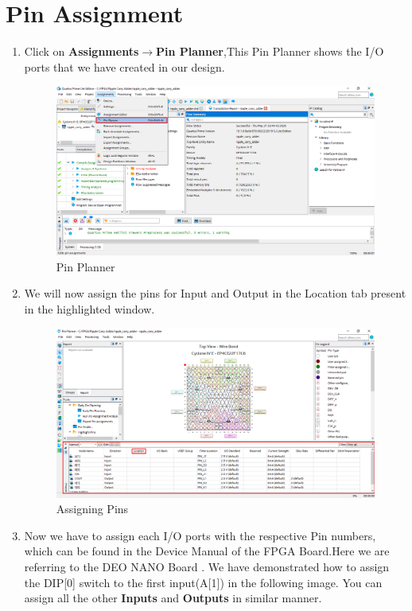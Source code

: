 \documentclass[12pt,singleside,a4paper]{article}
\begin{document}
\section{Pin  Assignment}
\begin{enumerate}

    \item Click on \textbf{Assignments}$\rightarrow$\textbf{Pin Planner},This Pin Planner shows the I/O ports that we have created in our design.
    \begin{figure}[H]
        \centering
        \includegraphics[width=14cm,keepaspectratio]{img11.png}
    \caption{Pin Planner}
    \end{figure}
    \newpage
    \item We will now assign the pins for Input and Output in the Location tab present in the highlighted window.
    \begin{figure}[H]
        \centering
        \includegraphics[width=14cm,keepaspectratio]{img12.png}
    \caption{Assigning Pins}
    \end{figure}
    
    \item Now we have to assign each I/O ports with the respective Pin numbers, which can be found in the Device Manual of the FPGA Board.Here we are referring to the DEO NANO Board . We have demonstrated how to assign the DIP[0] switch to the first input(A[1]) in the following image. You can assign all the other \textbf{Inputs} and \textbf{Outputs} in similar manner.
    

\end{enumerate}
\end{document}
